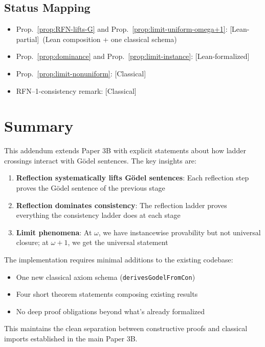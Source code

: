 \documentclass[11pt]{article}
\newcommand{\leanok}{\textsf{\textcolor{green!70!black}{[Lean-formalized]}}}
\newcommand{\leancited}{\textsf{\textcolor{blue!70!black}{[Classical]}}}
\newcommand{\leanpartial}{\textsf{\textcolor{violet!70!black}{[Lean-partial]}}}
\begin{document}
\subsection{Status Mapping}

\begin{itemize}
\item Prop.~\ref{prop:RFN-lifts-G} and Prop.~\ref{prop:limit-uniform-omega+1}: \leanpartial\ (Lean composition + one classical schema)
\item Prop.~\ref{prop:dominance} and Prop.~\ref{prop:limit-instance}: \leanok
\item Prop.~\ref{prop:limit-nonuniform}: \leancited
\item RFN--1-consistency remark: \leancited
\end{itemize}


\section{Summary}

This addendum extends Paper 3B with explicit statements about how ladder crossings interact with Gödel sentences. The key insights are:

\begin{enumerate}
\item \textbf{Reflection systematically lifts Gödel sentences}: Each reflection step proves the Gödel sentence of the previous stage
\item \textbf{Reflection dominates consistency}: The reflection ladder proves everything the consistency ladder does at each stage
\item \textbf{Limit phenomena}: At $\omega$, we have instancewise provability but not universal closure; at $\omega+1$, we get the universal statement
\end{enumerate}

The implementation requires minimal additions to the existing codebase:
\begin{itemize}
\item One new classical axiom schema (\texttt{derivesGodelFromCon})
\item Four short theorem statements composing existing results
\item No deep proof obligations beyond what's already formalized
\end{itemize}

This maintains the clean separation between constructive proofs and classical imports established in the main Paper 3B.
\end{document}
